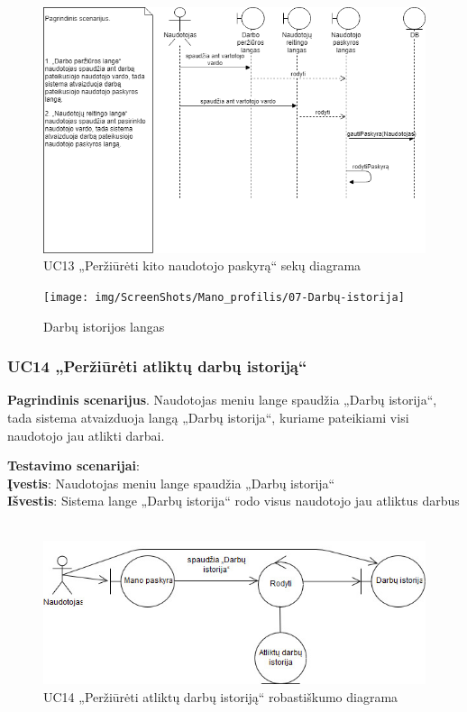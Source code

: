 \documentclass{VUMIFPSbakalaurinis}
\begin{document}
\begin{figure}[H]
	\centering
	\includegraphics[scale=0.6]{img/Sequence/SD13}
	\caption{UC13 „Peržiūrėti kito naudotojo paskyrą“ sekų diagrama}
	\label{img:uc13seq}
\end{figure}

\begin{figure}[H]
	\centering
	\texttt{[image: img/ScreenShots/Mano\_profilis/07-Darbų-istorija]}
	\caption{Darbų istorijos langas}
	\label{img:work history}
\end{figure}

\subsubsection{UC14 „Peržiūrėti atliktų darbų istoriją“}
\textbf{Pagrindinis scenarijus}. Naudotojas meniu lange spaudžia „Darbų istorija“, tada sistema atvaizduoja langą „Darbų istorija“, kuriame pateikiami visi naudotojo jau atlikti darbai.
\par \textbf{Testavimo scenarijai}:\\
\textbf{Įvestis}: Naudotojas meniu lange spaudžia „Darbų istorija“\\
\textbf{Išvestis}: Sistema lange „Darbų istorija“ rodo visus naudotojo jau atliktus darbus\\ \\

\begin{figure}[H]
	\centering
	\includegraphics[scale=0.6]{img/Robustness/UC14}
	\caption{UC14 „Peržiūrėti atliktų darbų istoriją“ robastiškumo diagrama}
	\label{img:uc14rob}
\end{figure}
\end{document}
